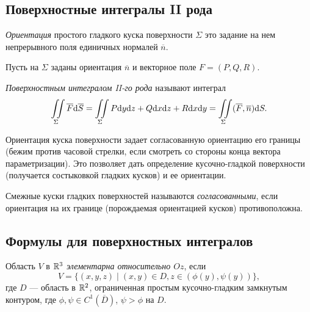 \subsection{Поверхностные интегралы II рода}
\begin{Def}
\textit{Ориентация} простого гладкого куска поверхности $\Sigma$ это
задание на нем непрерывного поля единичных нормалей $\overline n$.
\end{Def}

Пусть на $\Sigma$ заданы ориентация $\overline n$ и векторное поле $F = (P, Q, R)$. 

\begin{Def}
\textit{Поверхностным интегралом II-го рода} называют интеграл
$$
\iint\limits_{\Sigma} \overline F \mathrm{d} \overline S = \iint\limits_{\Sigma} P\mathrm{d} y \mathrm{d} z + Q \mathrm{d}x \mathrm{d} z+ R \mathrm{d}x \mathrm{d} y = \iint\limits_{\Sigma} (\overline F, \overline n) \mathrm{d} S.
$$
\end{Def}

Ориентация куска поверхности задает согласованную ориентацию его границы (бежим против часовой стрелки, если смотреть со стороны конца вектора параметризации). Это позволяет дать определение кусочно-гладкой поверхности (получается состыковкой гладких кусков) и ее ориентации.

\begin{Def}
Смежные куски гладких поверхностей называются \textit{согласованными}, если ориентация на их границе (порождаемая ориентацией кусков) противоположна.
\end{Def}

\subsection{Формулы для поверхностных интегралов}

\begin{Def}
Область $V$ в $\mathbb{R}^3$ \textit{элементарна относительно $Oz$}, если 
$$V = \{ (x, y, z) \mid (x, y) \in D, z \in (\phi(y), \psi(y)) \},$$
 где $D$ --- область в $\mathbb{R}^2$, ограниченная простым кусочно-гладким замкнутым контуром,  где $\phi, \psi \in C^{1}(\overline D)$, $\psi > \phi$ на $D$.
\end{Def}

